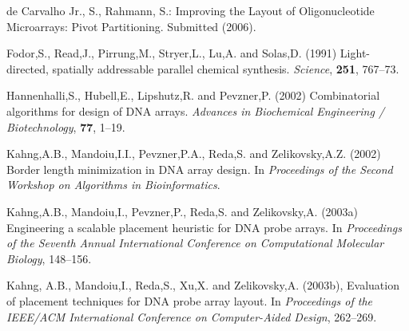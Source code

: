 \documentclass[english]{lni}
\newcommand{\ignore}[1]{}
\begin{document}
\begin{thebibliography}{9}

\ignore{
\bibitem{BINDER05} Binder,H. and Preibisch,S. (2005)
Specific and nonspecific hybridization of oligonucleotide probes on microarrays.
{\it Biophysical Journal}, {\bf 89}, 337--352.
}

de Carvalho Jr., S., Rahmann, S.:
Improving the Layout of Oligonucleotide Microarrays: Pivot Partitioning.
Submitted (2006).

\ignore{
\bibitem{CELA98} \c{C}ela,E. (1998) {\it The Quadratic
Assignment Problem: Theory and Algorithms}. Kluwer, Massachessets, USA.
\bibitem{CHASE76} Chase,P.J. (1976) Subsequence numbers and
logarithmic concavity. {\it Discrete Mathematics} {\bf 16}, 123--140.
\bibitem{FELDMAN93} Feldman,W. and Pevzner,P. (1994)
Gray code masks for sequencing by hibridization. {\it Genomics}, {\bf 23},
233--235.
\bibitem{FEO95} Feo,T.A. and Resende,M.G.C. (1995) Greedy
randomized adaptive search procedures. {\it Journal of Global Optimization},
{\bf 6}, 109--133.
}

 Fodor,S., Read,J., Pirrung,M.,
Stryer,L., Lu,A. and Solas,D. (1991) Light-directed, spatially addressable
parallel chemical synthesis. {\it Science}, {\bf 251}, 767--73.

 Hannenhalli,S.,
Hubell,E., Lipshutz,R. and Pevzner,P. (2002) Combinatorial algorithms for design
of DNA arrays. {\it Advances in Biochemical Engineering / Biotechnology},
{\bf 77}, 1--19.

 Kahng,A.B., Mandoiu,I.I.,
Pevzner,P.A., Reda,S. and Zelikovsky,A.Z. (2002) Border length minimization in
DNA array design. In {\it Proceedings of the Second Workshop on Algorithms in
Bioinformatics}.

 Kahng,A.B., Mandoiu,I.,
Pevzner,P., Reda,S. and Zelikovsky,A. (2003a) Engineering a scalable placement
heuristic for DNA probe arrays. In {\it Proceedings of the Seventh Annual
International Conference on Computational Molecular Biology}, 148--156.

 Kahng, A.B., Mandoiu,I., Reda,S.,
Xu,X. and Zelikovsky,A. (2003b), Evaluation of placement techniques for DNA
probe array layout. In {\it Proceedings of the IEEE/ACM International Conference
on Computer-Aided Design}, 262--269.


\end{thebibliography}
\end{document}
